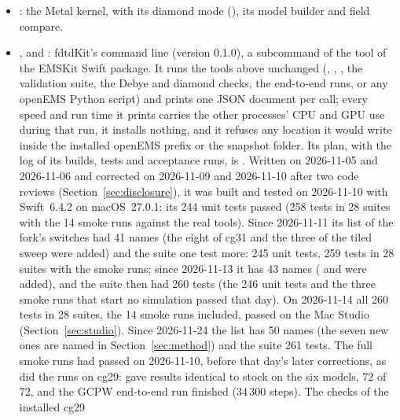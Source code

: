 \begin{itemize}
  at 1 to 15 threads and master's  engine (, , ) and the scripts
  that built master and ran it beside the fork (); from 2026-11-15 the stages of the M5 Max set
  (: ,  with the gate,  to ,
  , , ).
\item {}: the Metal kernel, with its diamond mode (), its model builder and field
  compare.
\item {},  and : fdtdKit's command line  (version
  0.1.0), a subcommand of the  tool of the EMSKit Swift package. It runs the tools above unchanged
  (, , , the validation suite, the Debye and diamond checks, the
  end-to-end runs, or any openEMS Python script) and prints one JSON document per call; every speed and run time it
  prints carries the other processes' CPU and GPU use during that run, it installs nothing, and it refuses any
  location it would write inside the installed openEMS prefix or the snapshot folder. Its plan, with the log of its
  builds, tests and acceptance runs, is . Written on 2026-11-05 and 2026-11-06 and
  corrected on 2026-11-09 and 2026-11-10 after two code reviews (Section~\ref{sec:disclosure}), it was built
  and tested on 2026-11-10 with Swift~6.4.2 on macOS~27.0.1: its 244 unit tests passed (258 tests in 28 suites with
  the 14 smoke runs against the real tools). Since 2026-11-11 its list of the fork's switches had 41 names (the
  eight of cg31 and the three of the tiled sweep were added) and the suite one test more: 245 unit tests, 259 tests
  in 28 suites with the smoke runs; since 2026-11-13 it has 43 names ( and
   were added), and the suite then had 260 tests (the 246 unit tests and the three smoke runs that start no simulation passed that day). On 2026-11-14 all 260 tests in 28 suites, the 14 smoke runs included, passed on the Mac Studio
  (Section~\ref{sec:studio}). Since 2026-11-24 the list has 50 names (the seven new ones are named in Section~\ref{sec:method}) and the suite 261 tests. The full smoke runs had passed on 2026-11-10, before that day's later
  corrections, as did the runs on cg29:  gave results identical to stock on the six models,
   72 of 72, and the GCPW end-to-end run finished (34\,300 steps). The checks of the installed cg29

\end{itemize}
